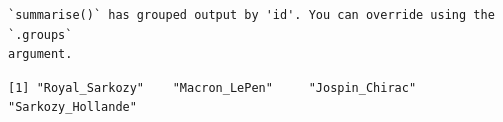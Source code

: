 \documentclass[
  letterpaper,
  DIV=11,
  numbers=noendperiod]{scrartcl}
\newenvironment{Shaded}{\begin{snugshade}}{\end{snugshade}}
\newcommand{\AttributeTok}[1]{\textcolor[rgb]{0.40,0.45,0.13}{#1}}
\newcommand{\FunctionTok}[1]{\textcolor[rgb]{0.28,0.35,0.67}{#1}}
\newcommand{\NormalTok}[1]{\textcolor[rgb]{0.00,0.23,0.31}{#1}}
\newcommand{\OtherTok}[1]{\textcolor[rgb]{0.00,0.23,0.31}{#1}}
\newcommand{\SpecialCharTok}[1]{\textcolor[rgb]{0.37,0.37,0.37}{#1}}
\newcommand{\StringTok}[1]{\textcolor[rgb]{0.13,0.47,0.30}{#1}}
\begin{document}
\begin{verbatim}
`summarise()` has grouped output by 'id'. You can override using the `.groups`
argument.
\end{verbatim}

\begin{Shaded}
\end{Shaded}

\begin{verbatim}
[1] "Royal_Sarkozy"    "Macron_LePen"     "Jospin_Chirac"    "Sarkozy_Hollande"
\end{verbatim}
\end{document}
